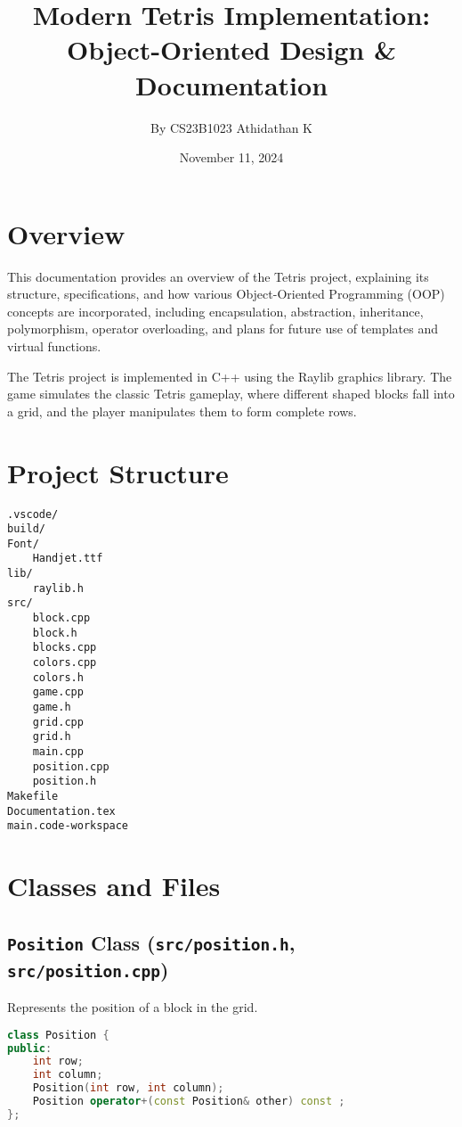\documentclass{article}
\begin{document}
\title{\textbf{Modern Tetris Implementation:\\Object-Oriented Design \& Documentation}}
\author{By CS23B1023 Athidathan K}
\date{November 11, 2024}
\maketitle
\tableofcontents

\section{Overview}

This documentation provides an overview of the Tetris project, explaining its structure, specifications, and how various Object-Oriented Programming (OOP) concepts are incorporated, including encapsulation, abstraction, inheritance, polymorphism, operator overloading, and plans for future use of templates and virtual functions.

The Tetris project is implemented in C++ using the Raylib graphics library. The game simulates the classic Tetris gameplay, where different shaped blocks fall into a grid, and the player manipulates them to form complete rows.

\section{Project Structure}

\begin{verbatim}
.vscode/
build/
Font/
    Handjet.ttf
lib/
    raylib.h
src/
    block.cpp
    block.h
    blocks.cpp
    colors.cpp
    colors.h
    game.cpp
    game.h
    grid.cpp
    grid.h
    main.cpp
    position.cpp
    position.h
Makefile
Documentation.tex
main.code-workspace
\end{verbatim}

\section{Classes and Files}

\subsection{\texttt{Position} Class (\texttt{src/position.h}, \texttt{src/position.cpp})}

Represents the position of a block in the grid.

\begin{lstlisting}[language=C++]
class Position {
public:
    int row;
    int column;
    Position(int row, int column);
    Position operator+(const Position& other) const ;
};
\end{lstlisting}
\end{document}

